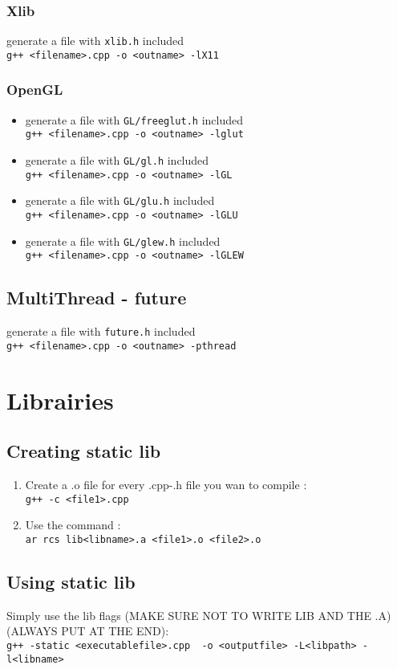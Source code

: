 \documentclass[12pt]{article}
\begin{document}
\subsubsection{Xlib}
generate a file with \verb|xlib.h| included \\ \verb|g++ <filename>.cpp -o <outname> -lX11|
\subsubsection{OpenGL}
\begin{itemize}
 \item generate a file with \verb|GL/freeglut.h| included \\ \verb|g++ <filename>.cpp -o <outname> -lglut|
 \item generate a file with \verb|GL/gl.h| included \\ \verb|g++ <filename>.cpp -o <outname> -lGL|
 \item generate a file with \verb|GL/glu.h| included \\ \verb|g++ <filename>.cpp -o <outname> -lGLU|
 \item generate a file with \verb|GL/glew.h| included \\ \verb|g++ <filename>.cpp -o <outname> -lGLEW|
\end{itemize}
\subsection{MultiThread - future}
generate a file with \verb|future.h| included \\ \verb|g++ <filename>.cpp -o <outname> -pthread|

\newpage

\section{Librairies}
\subsection{Creating static lib}
\begin{enumerate}
 \item Create a .o file for every .cpp-.h file you wan to compile : \\
       \verb|g++ -c <file1>.cpp|
 \item Use the command :\\
       \verb|ar rcs lib<libname>.a <file1>.o <file2>.o|
\end{enumerate}

\subsection{Using static lib}
Simply use the lib flags (MAKE SURE NOT TO WRITE LIB AND THE .A) (ALWAYS PUT AT THE END):\\
\verb|g++ -static <executablefile>.cpp  -o <outputfile> -L<libpath> -l<libname>|
\end{document}
